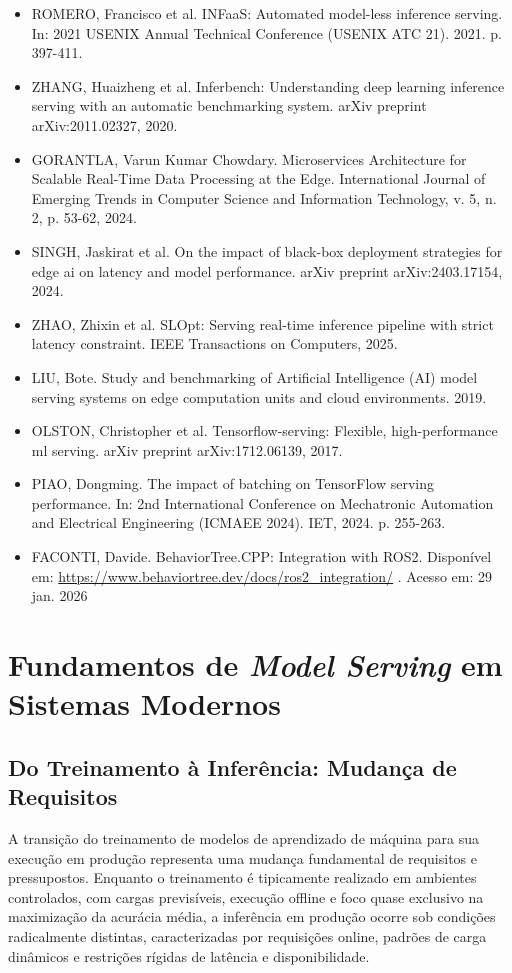 \begin{itemize}
    \item ROMERO, Francisco et al. {INFaaS}: Automated model-less inference serving. In: 2021 USENIX Annual Technical Conference (USENIX ATC 21). 2021. p. 397-411.
    \item ZHANG, Huaizheng et al. Inferbench: Understanding deep learning inference serving with an automatic benchmarking system. arXiv preprint arXiv:2011.02327, 2020.
    \item GORANTLA, Varun Kumar Chowdary. Microservices Architecture for Scalable Real-Time Data Processing at the Edge. International Journal of Emerging Trends in Computer Science and Information Technology, v. 5, n. 2, p. 53-62, 2024.
    \item SINGH, Jaskirat et al. On the impact of black-box deployment strategies for edge ai on latency and model performance. arXiv preprint arXiv:2403.17154, 2024.
    \item ZHAO, Zhixin et al. SLOpt: Serving real-time inference pipeline with strict latency constraint. IEEE Transactions on Computers, 2025.
    \item LIU, Bote. Study and benchmarking of Artificial Intelligence (AI) model serving systems on edge computation units and cloud environments. 2019.
    \item OLSTON, Christopher et al. Tensorflow-serving: Flexible, high-performance ml serving. arXiv preprint arXiv:1712.06139, 2017.
    \item PIAO, Dongming. The impact of batching on TensorFlow serving performance. In: 2nd International Conference on Mechatronic Automation and Electrical Engineering (ICMAEE 2024). IET, 2024. p. 255-263.
    \item FACONTI, Davide. BehaviorTree.CPP: Integration with ROS2. Disponível em: \url{https://www.behaviortree.dev/docs/ros2_integration/} . Acesso em: 29 jan. 2026
\end{itemize}

\section{Fundamentos de \emph{Model Serving} em Sistemas Modernos}
\subsection{Do Treinamento à Inferência: Mudança de Requisitos}
A transição do treinamento de modelos de aprendizado de máquina para sua execução em produção representa uma mudança fundamental de requisitos e pressupostos. Enquanto o treinamento é tipicamente realizado em ambientes controlados, com cargas previsíveis, execução offline e foco quase exclusivo na maximização da acurácia média, a inferência em produção ocorre sob condições radicalmente distintas, caracterizadas por requisições online, padrões de carga dinâmicos e restrições rígidas de latência e disponibilidade.

